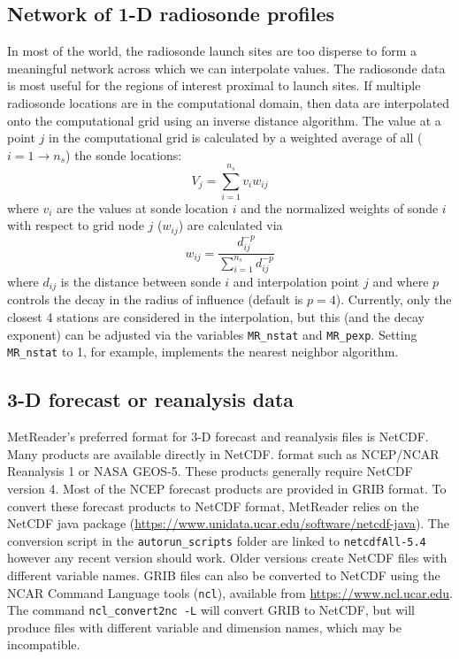 \documentclass[11pt]{article}   %
\begin{document}
\subsection{Network of 1-D radiosonde profiles}
In most of the world, the radiosonde launch sites are too disperse to form
a meaningful network across which we can interpolate values.  The radiosonde
data is most useful for the regions of interest proximal to launch sites.
If multiple radiosonde locations are in the computational domain, then data
are interpolated onto the computational grid using an inverse distance
algorithm.  The value at a point $j$ in the computational grid is calculated
by a weighted average of all ($i=1\rightarrow n_s$) the sonde locations:
\begin{equation*}
V_j = \sum_{i=1}^{n_s} v_i w_{ij}
\end{equation*}
where $v_i$ are the values at sonde location $i$ and the normalized weights of
sonde $i$ with respect to grid node $j$ ($w_{ij}$) are calculated via
\begin{equation*}
w_{ij} = \frac{d_{ij}^{-p}}{\sum_{i=1}^{n_s} d_{ij}^{-p}}
\end{equation*}
where $d_{ij}$ is the distance between sonde $i$ and interpolation point $j$
and where $p$ controls
the decay in the radius of influence (default is $p=4$).  Currently, only the closest
4 stations are considered in the interpolation, but this (and the decay exponent) can
be adjusted via the variables \texttt{MR\_nstat} and \texttt{MR\_pexp}.  Setting
\texttt{MR\_nstat} to 1, for example, implements the nearest neighbor algorithm.

\subsection{3-D forecast or reanalysis data}
MetReader's preferred format for 3-D forecast and reanalysis files is NetCDF.  Many
products are available directly in NetCDF. format such as NCEP/NCAR Reanalysis 1 or
NASA GEOS-5.  These products generally require NetCDF version 4.  Most of the NCEP
forecast products are provided in GRIB format.  To convert these forecast products
to NetCDF format, MetReader relies on the NetCDF java package
(\url{https://www.unidata.ucar.edu/software/netcdf-java}). The
conversion script in the \texttt{autorun\_scripts} folder are linked to \texttt{netcdfAll-5.4}
however any recent version should work.  Older versions create NetCDF files with
different variable names. GRIB files can also be converted to NetCDF using the NCAR Command
Language tools (\texttt{ncl}), available from \url{https://www.ncl.ucar.edu}.  The
command \texttt{ncl\_convert2nc -L} will convert GRIB to NetCDF, but will produce
files with different variable and dimension names, which may be incompatible.
\end{document}
